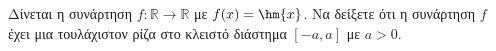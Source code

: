 Δίνεται η συνάρτηση $ f:\mathbb{R}\to\mathbb{R} $ με $ f(x)=\hm{x} $. Να δείξετε ότι η συνάρτηση $ f $ έχει μια τουλάχιστον ρίζα στο κλειστό διάστημα $ [-a,a] $ με $ a>0 $.
